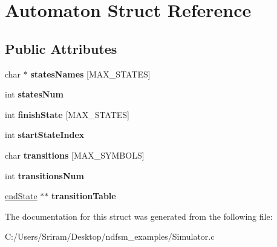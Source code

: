 \hypertarget{struct_automaton}{}\section{Automaton Struct Reference}
\label{struct_automaton}
\subsection*{Public Attributes}
\begin{DoxyCompactItemize}
\item 
\hypertarget{struct_automaton_ab32082ec868b099f9562140de98461b6}{}char $\ast$ {\bfseries states\+Names} \mbox{[}M\+A\+X\+\_\+\+S\+T\+A\+T\+E\+S\mbox{]}\label{struct_automaton_ab32082ec868b099f9562140de98461b6}

\item 
\hypertarget{struct_automaton_aa9f1d4be44861ad4b99fb34ded6ea201}{}int {\bfseries states\+Num}\label{struct_automaton_aa9f1d4be44861ad4b99fb34ded6ea201}

\item 
\hypertarget{struct_automaton_a4dd011b86ed6d61159a0a8206e1a86c4}{}int {\bfseries finish\+State} \mbox{[}M\+A\+X\+\_\+\+S\+T\+A\+T\+E\+S\mbox{]}\label{struct_automaton_a4dd011b86ed6d61159a0a8206e1a86c4}

\item 
\hypertarget{struct_automaton_a70ab9cbedd308e4c54c3814829f75a11}{}int {\bfseries start\+State\+Index}\label{struct_automaton_a70ab9cbedd308e4c54c3814829f75a11}

\item 
\hypertarget{struct_automaton_a635e154c2a2edf36014f1948bf2c87d7}{}char {\bfseries transitions} \mbox{[}M\+A\+X\+\_\+\+S\+Y\+M\+B\+O\+L\+S\mbox{]}\label{struct_automaton_a635e154c2a2edf36014f1948bf2c87d7}

\item 
\hypertarget{struct_automaton_a4c5dc896882f9fb56eaba5bba03cc5f0}{}int {\bfseries transitions\+Num}\label{struct_automaton_a4c5dc896882f9fb56eaba5bba03cc5f0}

\item 
\hypertarget{struct_automaton_ae9af21f2676bdbcfb2132873860d03e8}{}\hyperlink{structend_state}{end\+State} $\ast$$\ast$ {\bfseries transition\+Table}\label{struct_automaton_ae9af21f2676bdbcfb2132873860d03e8}

\end{DoxyCompactItemize}


The documentation for this struct was generated from the following file\+:\begin{DoxyCompactItemize}
\item 
C\+:/\+Users/\+Sriram/\+Desktop/ndfsm\+\_\+examples/Simulator.\+c\end{DoxyCompactItemize}
